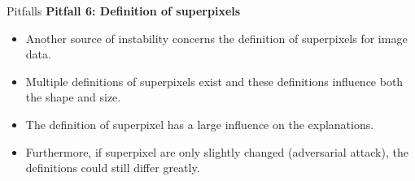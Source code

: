 \documentclass[11pt,compress,t,notes=noshow, xcolor=table]{beamer}
\begin{document}
\begin{vbframe}{Pitfalls}
\textbf{Pitfall 6: Definition of superpixels}
\begin{itemize}
	\item Another source of instability concerns the definition of superpixels for image data. 
	\item Multiple definitions of superpixels exist and these definitions influence both the shape and size. 
	\item The definition of superpixel has a large influence on the explanations. 
	\item Furthermore, if superpixel are only slightly changed (adversarial attack), the definitions could still differ greatly.  
\end{itemize}

\end{vbframe}


\endlecture
\end{document}

